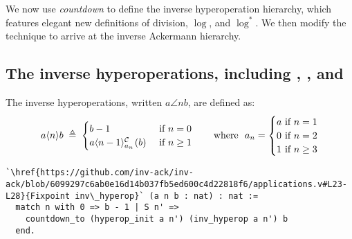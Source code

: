 We now use \emph{countdown} to define the inverse
hyperoperation hierarchy, which features elegant new definitions of
division, $\log$, and $\log^{*}$.
We then  {modify the technique} to arrive at the inverse
Ackermann hierarchy.

\subsection{The inverse hyperoperations, including , , and }

\begin{defn} \label{defn: inv-hyperop}
	The inverse hyperoperations, written $a\angle{n}b$, are defined as:
	\begin{equation}
	a\angle{n}b \; \triangleq \; \begin{cases}
	b - 1 & \hspace{-10pt} \quad \text{ if } n = 0 \\
	\cdt{a\angle{n-1}}{a_n}(b) & \hspace{-10pt} \quad \text{ if } n \ge 1
	\end{cases}
	\ \ \quad \text{ where } \ a_n = \begin{cases}
	a & \hspace{-10pt}\text{ if } n = 1 \\
	0 & \hspace{-10pt}\text{ if } n = 2 \\
	1 & \hspace{-10pt}\text{ if } n \ge 3
	\end{cases}
	\end{equation}
\begin{lstlisting}
`\href{https://github.com/inv-ack/inv-ack/blob/6099297c6ab0e16d14b037fb5ed600c4d22818f6/applications.v#L23-L28}{Fixpoint inv\_hyperop}` (a n b : nat) : nat :=
  match n with 0 => b - 1 | S n' => 
    countdown_to (hyperop_init a n') (inv_hyperop a n') b
  end.
\end{lstlisting}
\end{defn}
